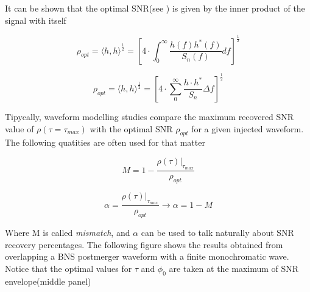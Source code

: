 It can be shown that the optimal SNR(see \cite[chapter 5]{Sathyaprakash:2009xs}) is given by the inner product of the signal with itself

\begin{equation}
\rho_{opt} = \langle h,h \rangle^{\frac{1}{2}} = \left[4\cdot\int_{0}^{\infty} \frac{h(f)h^{*}(f)}{S_n(f)}df\right]^{\frac{1}{2}}
\end{equation}

\begin{equation}\label{sopt}
\rho_{opt} = \langle h,h \rangle^{\frac{1}{2}} = \left[4\cdot\sum_{0}^{\infty} \frac{ h\cdot h^{*}}{S_n}\Delta f\right]^{\frac{1}{2}}
\end{equation}

Tipycally, waveform modelling studies compare the maximum recovered SNR value of $\rho(\tau=\tau_{max})$ with the optimal SNR $\rho_{opt}$ for a given injected waveform. The following quatities are often used for that matter 


\begin{equation}
M = 1-\frac{\rho(\tau)|_{\tau_{max}}}{\rho_{opt}}
\end{equation}

\begin{equation}
\alpha = \frac{\rho(\tau)|_{\tau_{max}}}{\rho_{opt}} \rightarrow \alpha = 1-M
\end{equation}

Where M is called \textit{mismatch}, and $\alpha$ can be used to talk naturally about SNR recovery percentages. The following figure shows the results obtained from overlapping a BNS postmerger waveform with a finite monochromatic wave. Notice that  the optimal values for $\tau$ and $\phi_0$ are taken at the maximum of SNR envelope(middle panel)



